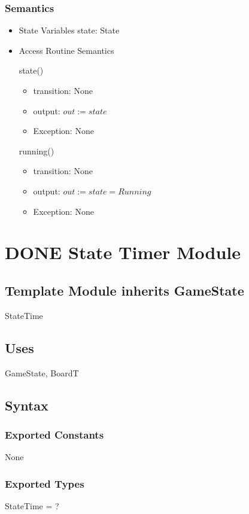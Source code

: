 \documentclass[11pt]{article}
\begin{document}
\subsubsection*{Semantics}
\label{sec:org09eac64}
\begin{itemize}
\item State Variables
\label{sec:org1d8d495}
state: State

\item Access Routine Semantics
\label{sec:org3794926}

state()
\begin{itemize}
\item transition: None
\item output: \(out := state\)
\item Exception: None
\end{itemize}

running()
\begin{itemize}
\item transition: None
\item output: \(out := state = Running\)
\item Exception: None
\end{itemize}

\newpage
\end{itemize}
\section{{\bfseries\sffamily DONE} State Timer Module}
\label{sec:org7c13b22}
\subsection*{Template Module inherits GameState}
\label{sec:orgc27d792}
StateTime

\subsection*{Uses}
\label{sec:org55ab6e6}
GameState, BoardT

\subsection*{Syntax}
\label{sec:orgf925ac6}
\subsubsection*{Exported Constants}
\label{sec:org5ba026b}
None

\subsubsection*{Exported Types}
\label{sec:org0f21311}
StateTime = ?
\end{document}
